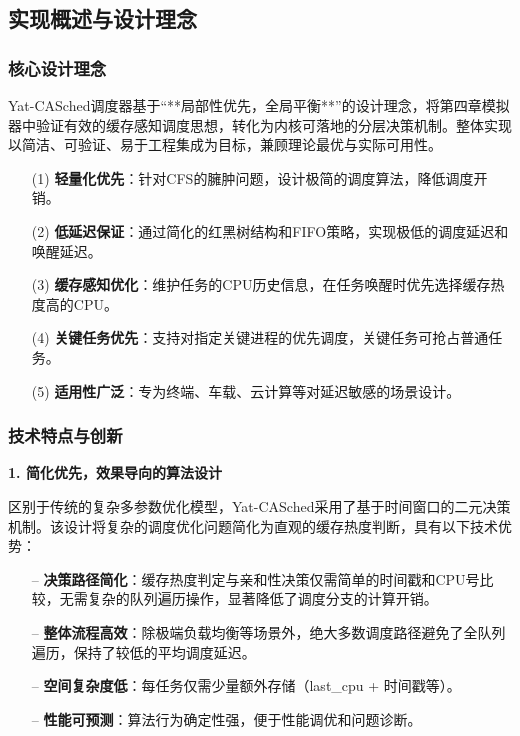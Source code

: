 \subsection{实现概述与设计理念}

\subsubsection{核心设计理念}

Yat-CASched调度器基于“**局部性优先，全局平衡**”的设计理念，将第四章模拟器中验证有效的缓存感知调度思想，转化为内核可落地的分层决策机制。整体实现以简洁、可验证、易于工程集成为目标，兼顾理论最优与实际可用性。

\begin{tcolorbox}[
    colback=blue!5!white,
    colframe=blue!50!black,
    title=\textbf{核心设计理念},
    fonttitle=\bfseries,
    arc=3pt
]
\begin{itemize}
    \item[(1)] \textbf{轻量化优先}：针对CFS的臃肿问题，设计极简的调度算法，降低调度开销。
    \item[(2)] \textbf{低延迟保证}：通过简化的红黑树结构和FIFO策略，实现极低的调度延迟和唤醒延迟。
    \item[(3)] \textbf{缓存感知优化}：维护任务的CPU历史信息，在任务唤醒时优先选择缓存热度高的CPU。
    \item[(4)] \textbf{关键任务优先}：支持对指定关键进程的优先调度，关键任务可抢占普通任务。
    \item[(5)] \textbf{适用性广泛}：专为终端、车载、云计算等对延迟敏感的场景设计。
\end{itemize}
\end{tcolorbox}

\subsubsection{技术特点与创新}

\textbf{1. 简化优先，效果导向的算法设计}

区别于传统的复杂多参数优化模型，Yat-CASched采用了基于时间窗口的二元决策机制。该设计将复杂的调度优化问题简化为直观的缓存热度判断，具有以下技术优势：

\begin{itemize}
    \item[--] \textbf{决策路径简化}：缓存热度判定与亲和性决策仅需简单的时间戳和CPU号比较，无需复杂的队列遍历操作，显著降低了调度分支的计算开销。
    \item[--] \textbf{整体流程高效}：除极端负载均衡等场景外，绝大多数调度路径避免了全队列遍历，保持了较低的平均调度延迟。
    \item[--] \textbf{空间复杂度低}：每任务仅需少量额外存储（last\_cpu + 时间戳等）。
    \item[--] \textbf{性能可预测}：算法行为确定性强，便于性能调优和问题诊断。
\end{itemize}

